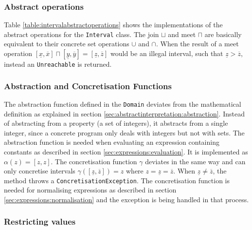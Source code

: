 

\subsubsection{Abstract operations}
Table \ref{table:intervalabstractoperations} shows the implementations of the abstract operations for the \texttt{Interval} class. The join $\sqcup$ and meet $\sqcap$ are basically equivalent to their concrete set operations $\cup$ and $\cap$. When the result of a meet operation $[\underline{x},\overline{x}] \sqcap [\underline{y},\overline{y}] = [\underline{z},\overline{z}]$ would be an illegal interval, such that 
$\underline{z}>\overline{z}$, instead an \texttt{Unreachable} is returned.



\subsubsection{Abstraction and Concretisation Functions}
The abstraction function defined in the \texttt{Domain} deviates from the mathematical definition as explained in section \ref{sec:abstractinterpretation:abstraction}. Instead of abstracting from a property (a set of integers), it abstracts from a single integer, since a concrete program only deals with integers but not with sets. The abstraction function is needed when evaluating an expression containing constants as described in section \ref{sec:expressions:evaluation}. It is implemented as $\alpha(z)=[z,z]$.
The concretisation function $\gamma$ deviates in the same way and can only concretise intervals $\gamma([\underline{z},\overline{z}])=z$ where $z = \underline{z} = \overline{z}$. When $\underline{z} \neq \overline{z}$, the method throws a \texttt{ConcretisationException}. The concretisation function is needed for normalising expressions as described in section \ref{sec:expressions:normalisation} and the exception is being handled in that process. 

\subsubsection{Restricting values}\label{sec:scalarvariables:intervals:restriction}

